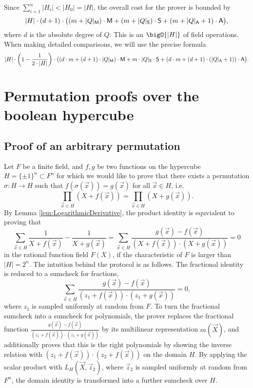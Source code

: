 \documentclass[11pt]{article}
\theoremstyle{definition}
\theoremstyle{remark}
\begin{document}
Since $\sum_{i=1}^{n} |H_{i}| < |H_0| = |H|$, the overall cost for the prover is bounded by 
\begin{equation}
\label{e:SumcheckCost}
|H|\cdot (d + 1) \cdot \big( (m + |Q|_\textsf M)\cdot\textsf M +
(m + |Q|_\textsf S)\cdot\textsf S +
(m + |Q|_\textsf A + 1)\cdot\textsf A
\big),
\end{equation}
where $d$ is the absolute degree of $Q$.
This is an $\bigO{|H|}$ of field operations.
When making detailed comparisons, we will use the precise formula
\begin{equation}
\label{e:SumcheckCostPrecise}
|H|\cdot \left(1-\frac{1}{2\cdot |H|}\right)\cdot \big( (d\cdot m + (d+1)\cdot |Q|_\textsf M)\cdot\textsf M +
 m\cdot |Q|_\textsf S \cdot\textsf S +
(d\cdot m + (d+1)\cdot (|Q|_\textsf A + 1))\cdot\textsf A
\big).
\end{equation}


\section{Permutation proofs over the boolean hypercube}


\subsection{Proof of an arbitrary permutation}
Let $F$ be a finite field, and $f, g$ be two functions on the hypercube $H=\{\pm 1\}^n\subset F^n$ for which we would like to prove that there exists a permutation $\sigma: H\rightarrow H$ such that $f(\sigma(\vec x)) = g(\vec x)$ for all $\vec x\in H$, i.e.
\[
\prod_{\vec x \in H} (X + f(\vec x)) = \prod_{\vec x \in H} (X + g(\vec x)). 
\]
By Lemma \ref{lem:LogarithmicDerivative}, the product identity is equvialent to proving that
\begin{equation}
\label{e:FractionalIdentityPermutation}
\sum_{\vec x\in H} \frac{1}{X + f(\vec x)} - \frac{1}{X + g(\vec x)} = \sum_{\vec x\in H} \frac{g(\vec x) - f(\vec x)}{(X + f(\vec x))\cdot (X + g(\vec x))} = 0
\end{equation}
in the rational function field $F(X)$, if the characteristic of $F$ is larger than $|H|=2^n$.
The intuition behind the protocol is as follows.
The fractional identity is reduced to a sumcheck for fractions, 
\begin{equation*}
\label{e:sumcheckFractions}
\sum_{\vec x\in H} \frac{g(\vec x) - f(\vec x)}{(z_1 + f(\vec x))\cdot (z_1 + g(\vec x))} =0,
\end{equation*}
where $z_1$ is sampled uniformly at random from $F$. 
To turn the fractional sumcheck into a sumcheck for polynomials, the prover replaces 
the fractional function $\frac{g(\vec x) - f(\vec x)}{(z_1 + f(\vec x))\cdot (z_1 + g(\vec x))}$ by its multilinear representation $m(\vec X)$, and additionally proves that this is the right polynomials by showing the inverse relation with $(z_1 + f(\vec x))\cdot (z_2 + f(\vec x))$ on the domain $H$.
By applying the scalar product with $L_H(\vec X, \vec z_2)$, where $\vec z_2$ is sampled uniformly at random from $F^n$, the domain identity is transformed into a further sumcheck over $H$.
\end{document}
